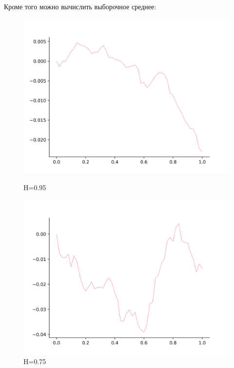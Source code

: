 \documentclass[a4paper,12pt]{article}
\numberwithin{equation}{section}
\begin{document}
	Кроме того можно вычислить выборочное среднее:
	\begin{figure}[H]
		\includegraphics[scale=0.4]{mean-1-95.png}
		\caption{H=0.95}
		\endminipage\hfill
		\includegraphics[scale=0.4]{mean-1-75.png}
		\caption{H=0.75}
		\endminipage\hfill
	\end{figure}
	
\end{document}

